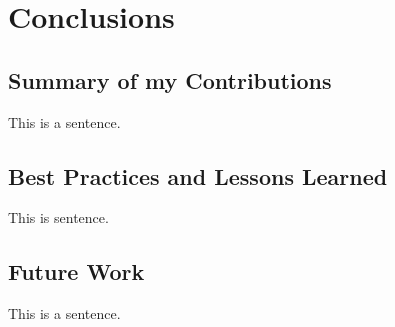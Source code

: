 \chapter{Conclusions}
%
\label{ch:conclusions}

\section{Summary of my Contributions}
This is a sentence.

\section{Best Practices and Lessons Learned}
This is sentence.

\section{Future Work}
This is a sentence.


